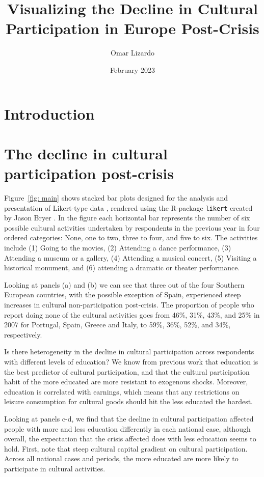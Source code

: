 \documentclass{article}
\title{Visualizing the Decline in Cultural Participation in Europe Post-Crisis}
\author{Omar Lizardo}
\date{February 2023}
\begin{document}
\maketitle

\section{Introduction}

\section{The decline in cultural participation post-crisis}

Figure~\ref{fig: main} shows stacked bar plots designed for the analysis and presentation of Likert-type data \citep{heiberger2014design}, rendered using the {\em} R-package \texttt{likert} created by Jason Bryer \citeyearpar{bryer-likert}. In the figure each horizontal bar represents the number of six possible cultural activities undertaken by respondents in the previous year in four ordered categories: None, one to two, three to four, and five to six. The activities include (1) Going to the movies, (2) Attending a dance performance, (3) Attending a museum or a gallery, (4) Attending a musical concert, (5) Visiting a historical monument, and (6) attending a dramatic or theater performance. 

Looking at panels (a) and (b) we can see that three out of the four Southern European countries, with the possible exception of Spain, experienced steep increases in cultural non-participation post-crisis. The proportion of people who report doing none of the cultural activities goes from 46\%, 31\%, 43\%, and 25\% in 2007 for Portugal, Spain, Greece and Italy, to 59\%, 36\%, 52\%, and 34\%, respectively. 

Is there heterogeneity in the decline in cultural participation across respondents with different levels of education? We know from previous work that education is the best predictor of cultural participation, and that the cultural participation habit of the more educated are more resistant to exogenous shocks. Moreover, education is correlated with earnings, which means that any restrictions on leisure consumption for cultural goods should hit the less educated the hardest. 

Looking at panels c-d, we find that the decline in cultural participation affected people with more and less education differently in each national case, although overall, the expectation that the crisis affected does with less education seems to hold. First, note that steep cultural capital gradient on cultural participation. Across all national cases and periods, the more educated are more likely to participate in cultural activities.  
\end{document}
